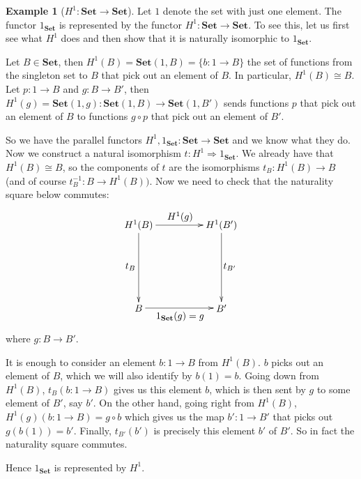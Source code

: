 \documentclass[11pt]{article}
\theoremstyle{definition}
\theoremstyle{definition}
\newtheorem{ex}{Example}
\theoremstyle{plain}
\theoremstyle{plain}
\theoremstyle{plain}
\begin{document}
\begin{ex}[$H^{1}:\textbf{Set} \to \textbf{Set}$]
\label{ex-set}
Let $1$ denote the set with just one element. The functor $1_{\textbf{Set}}$ is represented by the functor $H^{1}:\textbf{Set} \to \textbf{Set}$. To see this, let us first see what $H^{1}$ does and then show that it is naturally isomorphic to $1_{\textbf{Set}}$.

Let $B \in \textbf{Set}$, then $H^{1}(B) = \textbf{Set}(1, B) = \{  b:1 \to B \}$ the set of functions from the singleton set to $B$ that pick out an element of $B$. In particular, $H^{1}(B) \cong B$. Let $p: 1 \to B$ and $g: B \to B'$, then $H^{1}(g) = \textbf{Set}(1, g): \textbf{Set}(1, B) \to \textbf{Set}(1, B')$ sends functions $p$ that pick out an element of $B$ to functions $g \circ p$ that pick out an element of $B'$.

So we have the parallel functors $H^{1}, 1_{\textbf{Set}}: \textbf{Set} \to \textbf{Set}$ and we know what they do. Now we construct a natural isomorphism $t: H^{1} \Rightarrow 1_{\textbf{Set}}$. We already have that $H^{1}(B) \cong B$, so the components of $t$ are the isomorphisms $t_{B}: H^{1}(B) \to B$ (and of course $t^{-1}_{B}: B \to H^{1}(B))$. Now we need to check that the naturality square below commutes:

\begin{equation*}
\begin{xy}
(0, 0)*+{H^{1}(B)}="h1b"; (30, 0)*+{H^{1}(B')}="h1bp"; (0, -30)*+{B}="b"; (30, -30)*+{B'}="bp";
{\ar "h1b";"h1bp"}?*!/_3mm/{H^{1}(g)}; {\ar "b";"bp"}?*!/^3mm/{1_{\textbf{Set}}(g)=g};
{\ar "h1b";"b"}?*!/^3mm/{t_{B}}; {\ar "h1bp";"bp"}?*!/_3mm/{t_{B'}};
\end{xy}
\end{equation*}

where $g: B \to B'$.

It is enough to consider an element $b: 1 \to B$ from $H^{1}(B)$. $b$ picks out an element of $B$, which we will also identify by $b(1) = b$. Going down from $H^{1}(B)$, $t_{B}(b: 1 \to B)$ gives us this element $b$, which is then sent by $g$ to some element of $B'$, say $b'$. On the other hand, going right from $H^{1}(B)$, $H^{1}(g)(b: 1 \to B) = g \circ b$ which gives us the map $b': 1 \to B'$ that picks out $g(b(1)) = b'$. Finally, $t_{B'}(b')$ is precisely this element $b'$ of $B'$. So in fact the naturality square commutes.

Hence $1_{\textbf{Set}}$ is represented by $H^{1}$.
\end{ex}
\end{document}
